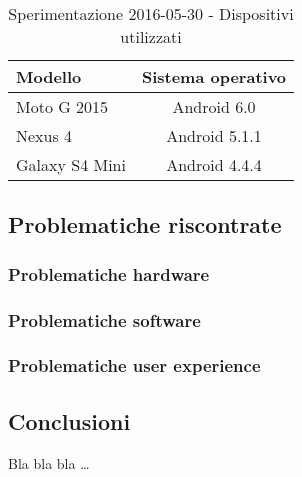 \documentclass[../Sperimentazione.tex]{subfiles}
\begin{document}
			\begin{table} [h]
			\centering
				\begin{tabular}{lc}
					\textbf{Modello} & \textbf{Sistema operativo} \\
					\toprule
					 Moto G 2015 & Android 6.0 \\
					 \midrule
					 Nexus 4 & Android 5.1.1 \\
					 \midrule
					 Galaxy S4 Mini & Android 4.4.4 \\
					\bottomrule
				\end{tabular}
				\caption{Sperimentazione 2016-05-30 - Dispositivi utilizzati}
				\label{tab:Sperimentazione1Dispositivi}
			\end{table}
		
			
		\newpage
			
	
		\newpage
		\subsection{Problematiche riscontrate}
		
			\subsubsection{Problematiche hardware}
		
			\subsubsection{Problematiche software}
		
			\subsubsection{Problematiche user experience}
			
		\newpage
		\subsection{Conclusioni}
			Bla bla bla \dots
\end{document}
